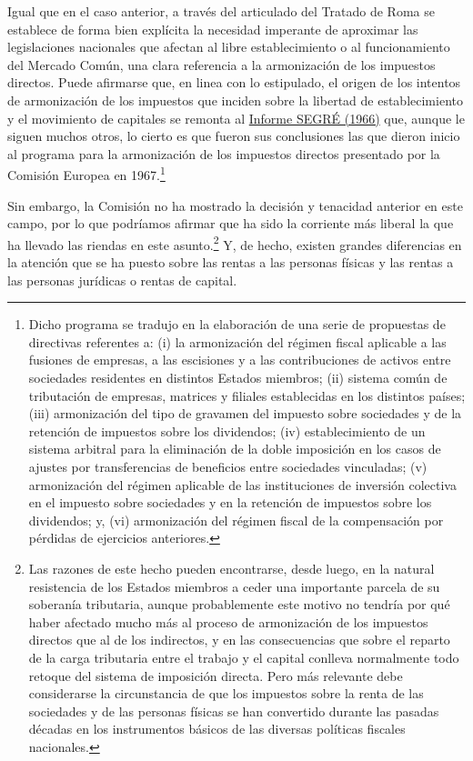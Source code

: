 \documentclass[10pt,a4paper]{article}
\begin{document}
Igual que en el caso anterior, a través del articulado del Tratado de Roma se establece de forma bien explícita la necesidad imperante de aproximar las legislaciones nacionales que afectan al libre establecimiento o al funcionamiento del Mercado Común, una clara referencia a la armonización de los impuestos directos. Puede afirmarse que, en linea con lo estipulado, el origen de los intentos de armonización de los impuestos que inciden sobre la libertad de establecimiento y el movimiento de capitales se remonta al \href{https://koflerge.org/wp-content/uploads/2019/01/segre.pdf}{Informe SEGRÉ (1966)} que, aunque le siguen muchos otros, lo cierto es que fueron sus conclusiones las que dieron inicio al programa para la armonización de los impuestos directos presentado por la Comisión Europea en 1967.\footnote{%
    Dicho programa se tradujo en la elaboración de una serie de propuestas de directivas referentes a: (i) la armonización del régimen fiscal aplicable a las fusiones de empresas, a las escisiones y a las contribuciones de activos entre sociedades residentes en distintos Estados miembros; (ii) sistema común de tributación de empresas, matrices y filiales establecidas en los distintos países; (iii) armonización del tipo de gravamen del impuesto sobre sociedades y de la retención de impuestos sobre los dividendos; (iv) establecimiento de un sistema arbitral para la eliminación de la doble imposición en los casos de ajustes por transferencias de beneficios entre sociedades vinculadas; (v) armonización del régimen aplicable de las instituciones de inversión colectiva en el impuesto sobre sociedades y en la retención de impuestos sobre los dividendos; y, (vi) armonización del régimen fiscal de la compensación por pérdidas de ejercicios anteriores.
} 

Sin embargo, la Comisión no ha mostrado la decisión y tenacidad anterior en este campo, por lo que podríamos afirmar que ha sido la corriente más liberal la que ha llevado las riendas en este asunto.\footnote{%
    Las razones de este hecho pueden encontrarse, desde luego, en la natural resistencia de los Estados miembros a ceder una importante parcela de su soberanía tributaria, aunque probablemente este motivo no tendría por qué haber afectado mucho más al proceso de armonización de los impuestos directos que al de los indirectos, y en las consecuencias que sobre el reparto de la carga tributaria entre el trabajo y el capital conlleva normalmente todo retoque del sistema de imposición directa. Pero más relevante debe considerarse la circunstancia de que los impuestos sobre la renta de las sociedades y de las personas físicas se han convertido durante las pasadas décadas en los instrumentos básicos de las diversas políticas fiscales nacionales.
} Y, de hecho, existen grandes diferencias en la atención que se ha puesto sobre las rentas a las personas físicas y las rentas a las personas jurídicas o rentas de capital.
\end{document}
